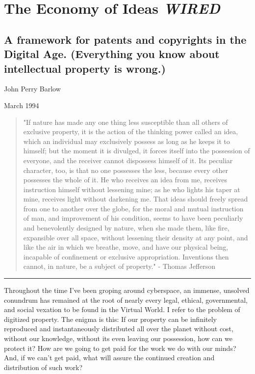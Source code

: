 \documentclass[
]{article}
\author{}
\date{}
\begin{document}
\hypertarget{header-n186}{%
\section{\texorpdfstring{The Economy of Ideas \textbar{}
\emph{WIRED}}{The Economy of Ideas \textbar{} WIRED}}\label{header-n186}}

\hypertarget{header-n188}{%
\subsection{A framework for patents and copyrights in the Digital Age.
(Everything you know about intellectual property is
wrong.)}\label{header-n188}}

John Perry Barlow

March 1994

\begin{quote}
"If nature has made any one thing less susceptible than all others of
exclusive property, it is the action of the thinking power called an
idea, which an individual may exclusively possess as long as he keeps it
to himself; but the moment it is divulged, it forces itself into the
possession of everyone, and the receiver cannot dispossess himself of
it. Its peculiar character, too, is that no one possesses the less,
because every other possesses the whole of it. He who receives an idea
from me, receives instruction himself without lessening mine; as he who
lights his taper at mine, receives light without darkening me. That
ideas should freely spread from one to another over the globe, for the
moral and mutual instruction of man, and improvement of his condition,
seems to have been peculiarly and benevolently designed by nature, when
she made them, like fire, expansible over all space, without lessening
their density at any point, and like the air in which we breathe, move,
and have our physical being, incapable of confinement or exclusive
appropriation. Inventions then cannot, in nature, be a subject of
property." - Thomas Jefferson
\end{quote}

\tableofcontents

\begin{center}\rule{0.5\linewidth}{0.5pt}\end{center}

Throughout the time I've been groping around cyberspace, an immense,
unsolved conundrum has remained at the root of nearly every legal,
ethical, governmental, and social vexation to be found in the Virtual
World. I refer to the problem of digitized property. The enigma is this:
If our property can be infinitely reproduced and instantaneously
distributed all over the planet without cost, without our knowledge,
without its even leaving our possession, how can we protect it? How are
we going to get paid for the work we do with our minds? And, if we can't
get paid, what will assure the continued creation and distribution of
such work?
\end{document}

